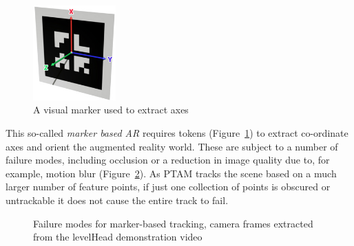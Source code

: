 \documentclass[a4paper,10pt]{report}
\begin{document}
\begin{figure}
  \begin{center}
    \includegraphics[width=120px]{marker-axis1}
  \end{center}
  \vspace{-10pt}
  \caption{A visual marker used to extract axes}
  \vspace{-20pt}
  \label{markerar}
\end{figure}
 This so-called \textit{marker based AR} requires tokens (Figure~\ref{markerar}) to extract co-ordinate axes and orient the augmented reality world. These are subject to a number of failure modes, including occlusion or a reduction in image quality due to, for example, motion blur (Figure~\ref{markerfail}). As PTAM tracks the scene based on a much larger number of feature points, if just one collection of points is obscured or untrackable it does not cause the entire track to fail.

\begin{figure}[t]
    \vspace{10pt}
    \quad
    \vspace{10pt}
    \caption{Failure modes for marker-based tracking, camera frames extracted from the levelHead demonstration video}
    \vspace{10pt}
    \label{markerfail}
\end{figure}
\end{document}
